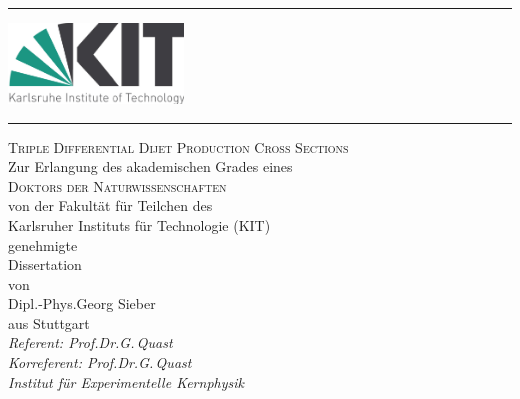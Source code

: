 \begin{titlepage}
    \begin{addmargin}[2cm]{0cm}
        \thispagestyle{empty}
        \begin{center}
            \vspace*{-2cm}
            \vspace{-0.3cm}
            \rule{\linewidth}{0.75pt}
            \vspace{-0.15cm}

            \includegraphics[width=0.35\textwidth]{figures/KIT_logo}

            \vspace{-0.3cm}
            \rule{\linewidth}{0.75pt}

            \vspace{2.8cm}


            \LARGE{\textsc{Triple Differential Dijet Production Cross Sections}}\\
            \vspace{3.0cm}
            \large{Zur Erlangung des akademischen Grades eines\\
                \textsc{Doktors der Naturwissenschaften}\\
                von der Fakult\"at f\"ur Teilchen des\\
            Karlsruher Instituts f\"ur Technologie (KIT)\\ genehmigte}\\
            \vspace{0.5 cm}
            \large{Dissertation}\\
            \vspace{0.6 cm}
            \large{von}\\
            \vspace{0.3 cm}
            \large{Dipl.-Phys.\;Georg Sieber\\aus Stuttgart}\\
            \vspace{1.5 cm}
            \large{\textit{Referent: Prof.\;Dr.\;G.\,Quast\\Korreferent: Prof.\;Dr.\;G.\,Quast\\
            Institut f\"ur Experimentelle Kernphysik}}\\
        \end{center}
    \end{addmargin}
\end{titlepage}

\cleardoublepage
